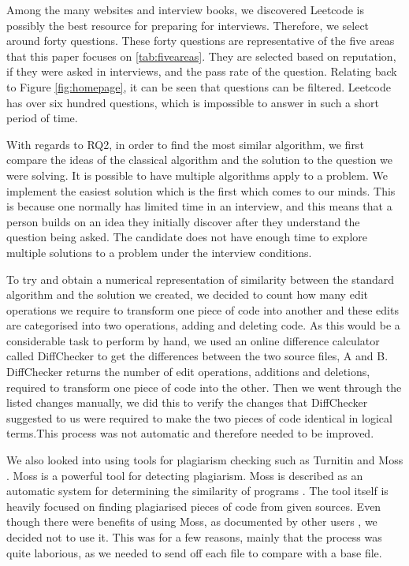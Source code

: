 \documentclass[10pt,twocolumn,hidelinks]{IEEEtran}
\begin{document}
\par Among the many websites and interview books, we discovered Leetcode is possibly the best resource for preparing for interviews. Therefore, we select around forty questions. These forty questions are representative of the five areas that this paper focuses on \ref{tab:fiveareas}. They are selected based on reputation, if they were asked in interviews, and the pass rate of the question. Relating back to Figure \ref{fig:homepage}, it can be seen that questions can be filtered. Leetcode has over six hundred questions, which is impossible to answer in such a short period of time.
\par With regards to RQ2, in order to find the most similar algorithm, we first compare the ideas of the classical algorithm and the solution to the question we were solving. It is possible to have multiple algorithms apply to a problem. We implement the easiest solution which is the first which comes to our minds. This is because one normally has limited time in an interview, and this means that a person builds on an idea they initially discover after they understand the question being asked. The candidate does not have enough time to explore multiple solutions to a problem under the interview conditions. 
\par To try and obtain a numerical representation of similarity between the standard algorithm and the solution we created, we decided to count how many edit operations we require to transform one piece of code into another and these edits are categorised into two operations, adding and deleting code.
As this would be a considerable task to perform by hand, we used an online difference calculator called DiffChecker \cite{diff} to get the differences between the two source files, A and B. DiffChecker returns the number of edit operations, additions and deletions, required to transform one piece of code into the other. Then we went through the listed changes manually, we did this to verify the changes that DiffChecker suggested to us were required to make the two pieces of code identical in logical terms.This process was not automatic and therefore needed to be improved. 
\par We also looked into using tools for plagiarism checking such as Turnitin and Moss \cite{Schleimer:2003:WLA:872757.872770}. Moss is a powerful tool for detecting plagiarism. Moss is described as an automatic system for determining the similarity of programs \cite{mosswebsite}. The tool itself is heavily focused on finding plagiarised pieces of code from given sources. Even though there were benefits of using Moss, as documented by other users \cite{MossBowyer}, we decided not to use it. This was for a few reasons, mainly that the process was quite laborious, as we needed to send off each file to compare with a base file. 
\end{document}
